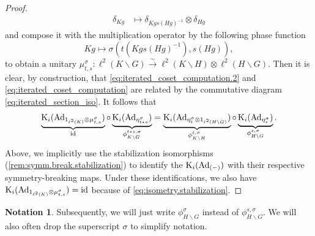 \documentclass{amsart}
\numberwithin{figure}{section}
\numberwithin{equation}{section}
\numberwithin{table}{section}
\theoremstyle{plain}
\theoremstyle{definition}
\newtheorem*{notation}{Notation}
\theoremstyle{remark}
\theoremstyle{nonumber}
\newcommand{\K}{\relax\ifmmode\operatorname{K}\else\textup{K}\fi}
\newcommand{\Ad}{\operatorname{Ad}} %
\newcommand{\id}{\operatorname{id}} %
\begin{document}
\begin{proof}
\begin{equation*}
\begin{aligned}
\delta_{Kg}&\mapsto \delta_{Kgs(Hg)^{-1}}\otimes \delta_{Hg}
\end{aligned}
\end{equation*}
and compose it with the multiplication operator by the following phase function
\begin{equation*}\label{eq:extra.phase.function}
Kg\mapsto \sigma(t(Kgs(Hg)^{-1}),s(Hg)),
\end{equation*}
to obtain a unitary $\mu_{t,s}^\sigma\colon \ell^2(K\backslash
G)\overset{\sim}{\to}\ell^2(K\backslash H)\otimes\ell^2(H\backslash G)$.
Then it is clear, by construction, that \eqref{eq:iterated_coset_computation.2} and
\eqref{eq:iterated_coset_computation} are related by the commutative diagram
\eqref{eq:iterated_section_iso}. It follows that 
\[ 
\underbrace{\K_i(\Ad_{1_{\ell^2(K)}\otimes\mu_{t,s}^\sigma})}_{\id}\circ
  \underbrace{\K_i(\Ad_{\eta_{t\star
  s}^\sigma})}_{\phi^{t\star s,\sigma}_{K\backslash G}}=
  \underbrace{\K_i(\Ad_{\eta_{t}^\sigma\otimes 1_{\ell^2(H\backslash
  G)}})}_{\phi^{t,\sigma}_{K\backslash
  H}}\circ\underbrace{\K_i(\Ad_{\eta_s^\sigma})}_{\phi^{s,\sigma}_{H\backslash
G}}.
\]
Above, we implicitly use the stabilization isomorphisms (\cref{rem:symm.break.stabilization}) to identify the $\K_i(\Ad_{(-)})$ with their respective symmetry-breaking maps. Under these identifications, we also have $\K_i(\Ad_{1_{\ell^2(K)}\otimes\mu_{t,s}^\sigma})=\id$ because of \eqref{eq:isometry.stabilization}.
\end{proof}

\begin{notation}
Subsequently, we will just write
$\phi^\sigma_{H\backslash G}$ instead of $\phi^{s,\sigma}_{H\backslash G}$.
We will also often drop the superscript $\sigma$ to simplify notation.
\end{notation}
\end{document}
